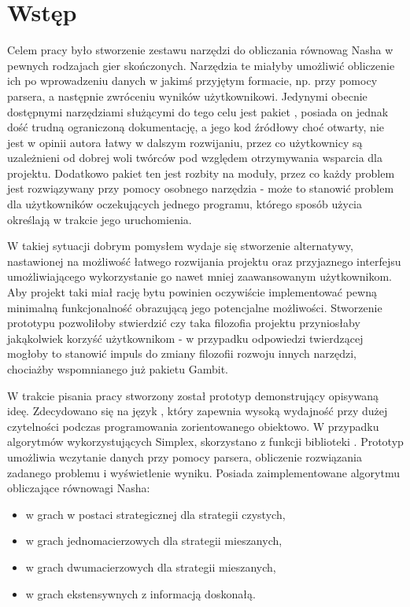\documentclass[polish]{standalone}
\begin{document}
\pagestyle{headings}

\section*{Wstęp}

Celem pracy było stworzenie zestawu narzędzi do obliczania równowag Nasha w pewnych rodzajach gier skończonych.
Narzędzia te miałyby umożliwić obliczenie ich po wprowadzeniu danych w jakimś przyjętym formacie, np. przy pomocy 
parsera, a następnie zwróceniu wyników użytkownikowi. Jedynymi obecnie dostępnymi narzędziami służącymi do tego celu
jest pakiet , posiada on jednak dość trudną ograniczoną dokumentację, a jego kod źródłowy choć otwarty,
nie jest w opinii autora łatwy w dalszym rozwijaniu, przez co użytkownicy są uzależnieni od dobrej woli twórców pod
względem otrzymywania wsparcia dla projektu. Dodatkowo pakiet ten jest rozbity na moduły, przez co każdy problem jest
rozwiązywany przy pomocy osobnego narzędzia - może to stanowić problem dla użytkowników oczekujących jednego programu,
którego sposób użycia określają w trakcie jego uruchomienia.

W takiej sytuacji dobrym pomysłem wydaje się stworzenie alternatywy, nastawionej na możliwość łatwego rozwijania
projektu oraz przyjaznego interfejsu umożliwiającego wykorzystanie go nawet mniej zaawansowanym użytkownikom. Aby
projekt taki miał rację bytu powinien oczywiście implementować pewną minimalną funkcjonalność obrazującą jego
potencjalne możliwości. Stworzenie prototypu pozwoliłoby stwierdzić czy taka filozofia projektu przyniosłaby jakąkolwiek
korzyść użytkownikom - w przypadku odpowiedzi twierdzącej mogłoby to stanowić impuls do zmiany filozofii rozwoju innych
narzędzi, chociażby wspomnianego już pakietu Gambit.

W trakcie pisania pracy stworzony został prototyp demonstrujący opisywaną ideę. Zdecydowano się na język ,
który zapewnia wysoką wydajność przy dużej czytelności podczas programowania zorientowanego obiektowo. W przypadku
algorytmów wykorzystujących Simplex, skorzystano z funkcji biblioteki . Prototyp umożliwia wczytanie danych
przy pomocy parsera, obliczenie rozwiązania zadanego problemu i wyświetlenie wyniku. Posiada zaimplementowane algorytmu
obliczające równowagi Nasha:
\begin{itemize}
\item w grach w postaci strategicznej dla strategii czystych,
\item w grach jednomacierzowych dla strategii mieszanych,
\item w grach dwumacierzowych dla strategii mieszanych,
\item w grach ekstensywnych z informacją doskonałą.
\end{itemize}
\end{document}
